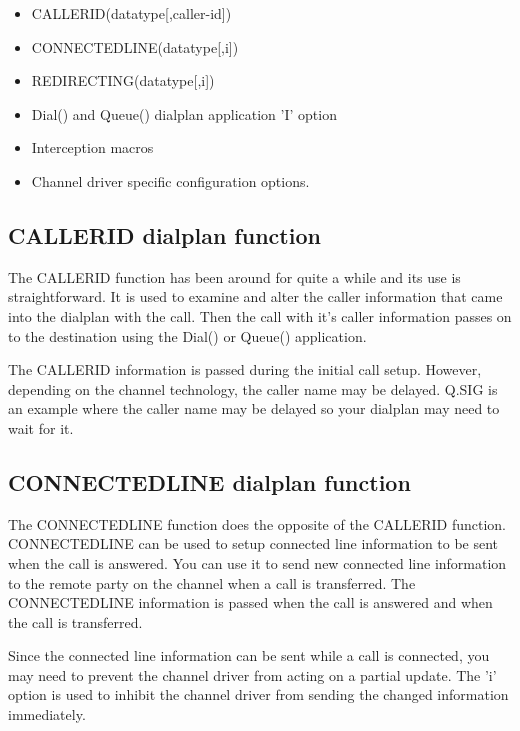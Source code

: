 \begin{itemize}
\item CALLERID(datatype[,caller-id])

\item CONNECTEDLINE(datatype[,i])

\item REDIRECTING(datatype[,i])

\item Dial() and Queue() dialplan application 'I' option

\item Interception macros

\item Channel driver specific configuration options.
\end{itemize}

\subsection{CALLERID dialplan function}

The CALLERID function has been around for quite a while and its use is
straightforward.  It is used to examine and alter the caller information
that came into the dialplan with the call.  Then the call with it's caller
information passes on to the destination using the Dial() or Queue()
application.

The CALLERID information is passed during the initial call setup.
However, depending on the channel technology, the caller name may be
delayed.  Q.SIG is an example where the caller name may be delayed so your
dialplan may need to wait for it.

\subsection{CONNECTEDLINE dialplan function}

The CONNECTEDLINE function does the opposite of the CALLERID function.
CONNECTEDLINE can be used to setup connected line information to be sent when the
call is answered.  You can use it to send new connected line information
to the remote party on the channel when a call is transferred.  The
CONNECTEDLINE information is passed when the call is answered and when the
call is transferred.

Since the connected line information can be sent while a call is
connected, you may need to prevent the channel driver from acting on a
partial update.  The 'i' option is used to inhibit the channel driver from
sending the changed information immediately.

